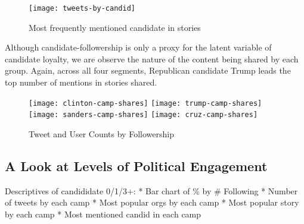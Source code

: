 \begin{figure}[H]  
\centering 
  \texttt{[image: tweets-by-candid]}  
  \caption{Most frequently mentioned candidate in stories
    \label{fig:tweets-by-candid}}
\end{figure} 

 


Although candidate-followership is only a proxy for the latent variable of candidate loyalty, we are observe the nature of the content being shared by each group. Again, across all four segments, Republican candidate Trump leads the top number of mentions in stories shared.

\begin{figure}[H] 
\centering 
 \texttt{[image: clinton-camp-shares]}
 \texttt{[image: trump-camp-shares]}  
 \texttt{[image: sanders-camp-shares]}  
 \texttt{[image: cruz-camp-shares]}  
  \caption{Tweet and User Counts by Followership
    \label{fig:users-tweets-by-candid}}
\end{figure}
 
\subsection{A Look at Levels of Political Engagement}
Descriptives of candididate 0/1/3+:
* Bar chart of \% by \# Following
* Number of tweets by each camp
* Most popular orgs by each camp
* Most popular story by each camp
* Most mentioned candid in each camp












